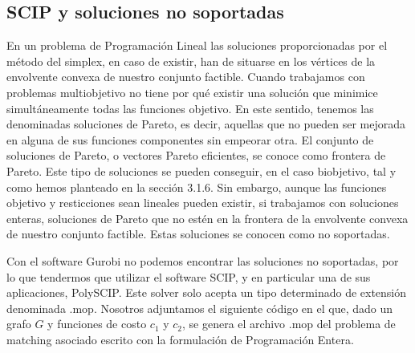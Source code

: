 \documentclass[twoside,a4paper,openright,12pt]{book}
\begin{document}
\newpage
\subsection{SCIP y soluciones no soportadas}
En un problema de Programación Lineal las soluciones proporcionadas por el método del simplex, en caso de existir, han de situarse en los vértices de la envolvente convexa de nuestro conjunto factible. Cuando trabajamos con problemas multiobjetivo no tiene por qué existir una solución que minimice simultáneamente todas las funciones objetivo. En este sentido, tenemos las denominadas soluciones de Pareto, es decir, aquellas que no pueden ser mejorada en alguna de sus funciones componentes sin empeorar otra. El conjunto de soluciones de Pareto, o vectores Pareto eficientes, se conoce como frontera de Pareto. Este tipo de soluciones se pueden conseguir, en el caso biobjetivo, tal y como hemos planteado en la sección 3.1.6. Sin embargo, aunque las funciones objetivo y resticciones sean lineales pueden existir, si trabajamos con soluciones enteras, soluciones de Pareto que no estén en la frontera de la envolvente convexa de nuestro conjunto factible. Estas soluciones se conocen como no soportadas.

Con el software Gurobi no podemos encontrar las soluciones no soportadas, por lo que tendermos que utilizar el software SCIP, y en particular una de sus aplicaciones, PolySCIP. Este solver solo acepta un tipo determinado de extensión denominada .mop. Nosotros adjuntamos el siguiente código en el que, dado un grafo $G$ y funciones de costo $c_1$ y $c_2$, se genera el archivo .mop del problema de matching asociado escrito con la formulación de Programación Entera.
\end{document}
